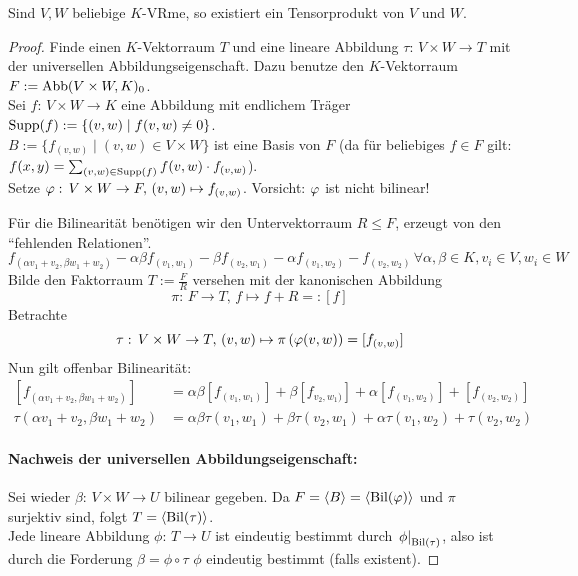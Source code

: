 \documentclass[parskip,a4paper,twoside,DIV15,BCOR12mm]{scrbook}
\begin{document}
\begin{theo}
\label{Satz 15.5}
Sind $V,W$ beliebige $K$-VRme, so existiert ein Tensorprodukt von $V$ und $W$.
\end{theo}

\begin{proof}
Finde einen \(K\)-Vektorraum \(T\) und eine lineare Abbildung 
\(\tau:\,V\times W\to T\) mit der universellen Abbildungseigenschaft. Dazu 
benutze den \(K\)-Vektorraum\break\(F:=\operatorname{Abb}(V\times W,K)_{0}\).\\
Sei \(f:\,V\times W\to K\) eine Abbildung mit endlichem Träger\break 
\(\operatorname{Supp}(f):=\{(v,w)\mid f(v,w)\neq0\}\).\\
\(B:=\{f_{(v,w)}\mid(v,w)\in V\times W\}\) ist eine Basis von \(F\) (da für 
beliebiges \(f\in F\) gilt: \(f(x,y)=\sum_{(v,w)\in\operatorname{Supp}(f)}{f(v,w)\cdot f_{(v,w)}}\)).\\
Setze \(\varphi:\,V\times W\to F,\,(v,w)\mapsto f_{(v,w)}\). Vorsicht: \(\varphi\) ist
nicht bilinear!

Für die Bilinearität benötigen wir den Untervektorraum \(R\leq F\), 
erzeugt von den ``fehlenden Relationen''.
\[
f_{(\alpha v_{1}+v_{2},\beta w_{1}+w_{2})}-\alpha\beta f_{(v_{1},w_{1})}-
    \beta f_{(v_{2},w_{1})}-\alpha f_{(v_{1},w_{2})}-f_{(v_{2},w_{2})}\,
    \forall\alpha,\beta\in K,v_{i}\in V,w_{i}\in W
\]
Bilde den Faktorraum \(T:=\frac{F}{R}\) versehen mit der kanonischen Abbildung
\[
\pi:\,F\to T,\,f\mapsto f+R=:[f]
\]
Betrachte
\[
\tau:\,V\times W\to T,\,(v,w)\mapsto\pi\left(\varphi(v,w)\right)=[f_{(v,w)}]
\]
Nun gilt offenbar Bilinearität:
\begin{align*}
\left[f_{(\alpha v_{1}+v_{2},\beta w_{1}+w_{2})}\right]&=
    \alpha\beta\left[f_{(v_{1},w_{1})}\right]+
    \beta\left[f_{v_{2},w_{1})}\right]+
    \alpha\left[f_{(v_{1},w_{2})}\right]+
    \left[f_{(v_{2},w_{2})}\right]\\
\tau(\alpha v_{1}+v_{2},\beta w_{1}+w_{2})&=\alpha\beta\tau(v_{1},w_{1})+
    \beta\tau(v_{2},w_{1})+\alpha\tau(v_{1},w_{2})+\tau(v_{2},w_{2})
\end{align*}
\paragraph{Nachweis der universellen Abbildungseigenschaft:}{Sei wieder 
\(\beta:\,V\times W\to U\) bilinear gegeben. Da 
\(F=\langle B\rangle=\langle\operatorname{Bil}(\varphi)\rangle\) und \(\pi\) surjektiv sind,
folgt \(T=\langle\operatorname{Bil}(\tau)\rangle\).\\
Jede lineare Abbildung \(\phi:\,T\to U\) ist eindeutig bestimmt durch 
\(\left.\phi\right|_{\operatorname{Bil}(\tau)}\), also ist durch die Forderung 
\(\beta=\phi\circ\tau\) \(\phi\) eindeutig bestimmt (falls existent).}

\end{proof}
\end{document}
